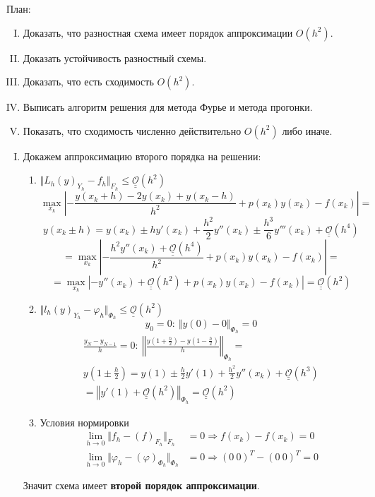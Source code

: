 \documentclass[12pt]{article}
\def\bigO{ \underline{\underline{\mathcal{O}}} }
\begin{document}
План:
\begin{enumerate}[I.]
	\item Доказать, что разностная схема имеет порядок аппроксимации $O(h^2)$.
	\item Доказать устойчивость разностный схемы.
	\item Доказать, что есть сходимость $O(h^2)$.
	\item Выписать алгоритм решения для метода Фурье и метода прогонки.
	\item Показать, что сходимость численно действительно $O(h^2)$ либо иначе.
\end{enumerate}

\newpage

\begin{enumerate}[I.]
	\item Докажем аппроксимацию второго порядка на решении:
	      \begin{enumerate}
		      \item $\Vert L_h(y)_{Y_h}-f_h\Vert_{F_h}\leq\bigO(h^2)$
		            \[\max_{x_k}\left|-\frac{y(x_k+h)-2y(x_k)+y(x_k-h)}{h^2}+p(x_k)y(x_k)-f(x_k)\right|=\]
		            \[y(x_k\pm h)=y(x_k)\pm hy'(x_k)+\frac{h^2}{2}y''(x_k)\pm\frac{h^3}{6}y'''(x_k)+\bigO(h^4)\]
		            \[=\max_{x_k}\left|-\frac{h^2y''(x_k)+\bigO(h^4)}{h^2}+p(x_k)y(x_k)-f(x_k)\right|=\]
		            \[=\max_{x_k}\left|-y''(x_k)+\bigO(h^2)+p(x_k)y(x_k)-f(x_k)\right|=\bigO(h^2)\]
		      \item $\Vert l_h(y)_{Y_h}-\varphi_h\Vert_{\Phi_h}\leq\bigO(h^2)$
		            \[y_0 = 0:\ \Vert y(0)-0\Vert_{\Phi_h}=0\]
		            \begin{multline*}
			            \frac{y_N - y_{N-1}}{h} = 0:\ \left\Vert\frac{y\left(1+\frac{h}{2}\right)-y\left(1-\frac{h}{2}\right)}{h}\right\Vert_{\Phi_h}= \\
			            y\left(1\pm \frac{h}{2}\right)=y(1)\pm \frac{h}{2}y'(1)+\frac{h^2}{2}y''(x_k)+\bigO(h^3) \\
			            =\left\Vert y'(1)+\bigO(h^2)\right\Vert_{\Phi_h}=\bigO(h^2)
		            \end{multline*}
		      \item Условия нормировки
		            \begin{align*}
			            \lim_{h\rightarrow0}\Vert f_h-(f)_{F_h}\Vert_{F_h}                   & =0 \Rightarrow f(x_k)-f(x_k) = 0       \\
			            \lim_{h\rightarrow0}\Vert \varphi_h-(\varphi)_{\Phi_h}\Vert_{\Phi_h} & =0 \Rightarrow (0\ 0)^T - (0\ 0)^T = 0
		            \end{align*}
	      \end{enumerate}
	      Значит схема имеет \textbf{второй порядок аппроксимации}.


\end{enumerate}
\end{document}
